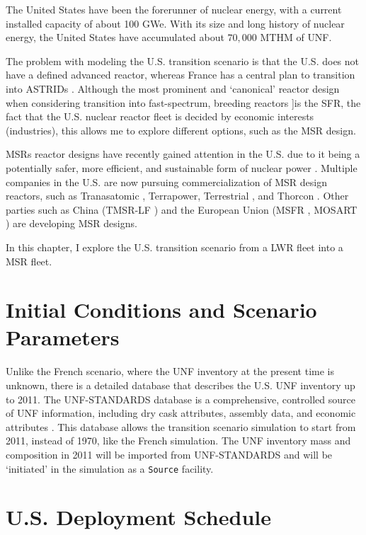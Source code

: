 
The United States have been the forerunner of nuclear energy, with a current
installed capacity of about 100 GWe. With its size and long history of nuclear
energy, the United States have accumulated about $70,000$ \gls{MTHM} of \gls{UNF}.

The problem with modeling the U.S. transition scenario is that the U.S. does not have
a defined advanced reactor, whereas France has a central plan to transition into \glspl{ASTRID} \cite{boullis_french_2015, varaine_pre-conceptual_2012}.
Although the most prominent and `canonical' reactor design when considering
transition into fast-spectrum, breeding reactors ]is the \gls{SFR},
the fact that the U.S. nuclear reactor fleet
is decided by economic interests (industries), this allows me to explore
different options, such as the \gls{MSR} design.

\glspl{MSR} reactor designs have recently gained attention in the U.S. due to it being a
potentially safer, more efficient, and sustainable form of nuclear power
\cite{serp_molten_2014}. Multiple companies in the U.S. are now pursuing
commercialization of \gls{MSR} design reactors, such as Tranasatomic \cite{transatomic_technical_2016}
, Terrapower, Terrestrial \cite{leblanc_18-_2017}, and
Thorcon \cite{dolan_19-_2017}. Other parties such as China (TMSR-LF \cite{dai_17-_2017}) 
and the European Union (MSFR \cite{heuer_towards_2014}, MOSART \cite{ignatiev_molten_2014})
are developing \gls{MSR} designs.

In this chapter, I explore the U.S. transition scenario
from a \gls{LWR} fleet into a \gls{MSR} fleet.

\section{Initial Conditions and Scenario Parameters}
Unlike the French scenario,
where the \gls{UNF} inventory at the present time is unknown, there is a
detailed database that describes the U.S. \gls{UNF} inventory up to 2011.
The \gls{UNF-STANDARDS} database is a comprehensive,
controlled source of \gls{UNF} information, including dry cask attributes, assembly
data, and economic attributes \cite{peterson_unf-st&dards_2017}. This database
allows the transition scenario simulation to start from 2011, instead of 1970,
like the French simulation. The \gls{UNF} inventory mass and composition in 2011
will be imported from \gls{UNF-STANDARDS} and will be `initiated' in the simulation
as a \texttt{Source} facility.

\section{U.S. Deployment Schedule}

